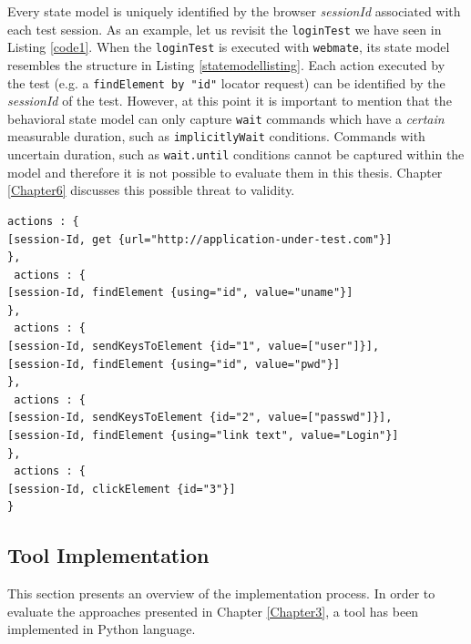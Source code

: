 Every state model is uniquely identified by the browser \textit{sessionId} associated with each test session. As an example, let us revisit the \texttt{loginTest} we have seen in Listing \ref{code1}. When the \texttt{loginTest} is executed with \texttt{webmate}, its state model resembles the structure in Listing \ref{statemodellisting}. Each action executed by the test (e.g. a \texttt{findElement by "id"} locator request) can be identified by the \textit{sessionId} of the test. However, at this point it is important to mention that the behavioral state model can only capture \texttt{wait} commands which have a \textit{certain} measurable duration, such as \texttt{implicitlyWait} conditions. Commands with uncertain duration, such as \texttt{wait.until} conditions cannot be captured within the model and therefore it is not possible to evaluate them in this thesis. Chapter \ref{Chapter6} discusses this possible threat to validity. 

\begin{center}
\begin{scriptsize}
\centering
\lstset{
  basicstyle=\ttfamily,
  columns=fullflexible,
  keepspaces=true,
}
  
\begin{lstlisting}[caption=Extracted behavioral state model for \texttt{loginTest},label=statemodellisting]
 actions : { 
[session-Id, get {url="http://application-under-test.com"}]
},
 actions : { 
[session-Id, findElement {using="id", value="uname"}]
},
 actions : { 
[session-Id, sendKeysToElement {id="1", value=["user"]}],
[session-Id, findElement {using="id", value="pwd"}]
},
 actions : { 
[session-Id, sendKeysToElement {id="2", value=["passwd"]}],
[session-Id, findElement {using="link text", value="Login"}]
},
 actions : { 
[session-Id, clickElement {id="3"}]
}
\end{lstlisting}
\end{scriptsize} 
\end{center}

\subsection{Tool Implementation}
\label{toolimplementation}
This section presents an overview of the implementation process. In order to evaluate the approaches presented in Chapter \ref{Chapter3}, a tool has been implemented in Python language. 

